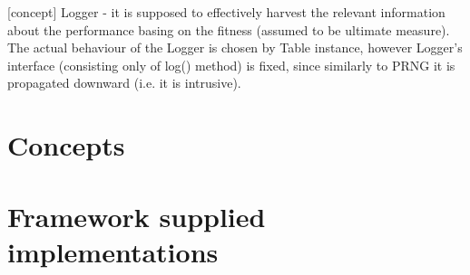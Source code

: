 [concept] Logger - it is supposed to effectively harvest the relevant information
	about the performance basing on the fitness (assumed to be ultimate measure).
	The actual behaviour of the Logger is chosen by Table instance, however
	Logger's interface (consisting only of log() method) is fixed,
	since similarly to PRNG it is propagated downward (i.e. it is intrusive).

\section{Concepts}

\section{Framework supplied implementations}

